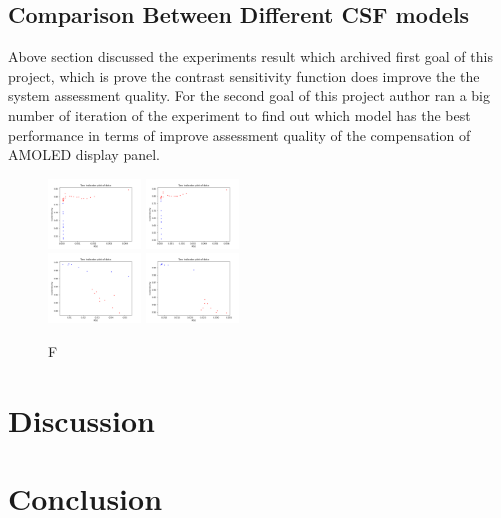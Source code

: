 \documentclass{article}
\begin{document}
\subsection{Comparison Between Different CSF models}
Above section discussed the experiments result which archived first goal of this project, which is prove the contrast sensitivity function does improve the the system assessment quality. For the second goal of this project author ran a big number of iteration of the experiment to find out which model has the best performance in terms of improve assessment quality of the compensation of AMOLED display panel. 
\begin{figure}[h]
    \centering
    \includegraphics[width=0.22\textwidth]{images/Barton_CSFed_G_01r_23b_result.png}\hfill    
    \includegraphics[width=0.22\textwidth]{images/Daly_CSFed_G_01r_23b_result.png}\hfill
    \\[\smallskipamount]    
    \includegraphics[width=0.22\textwidth]{images/NewDoG_Streched_CSFed_A1_G_01r_23b_result.png}\hfill
    \includegraphics[width=0.22\textwidth]{images/MS_STRECH_CSFED_G_A1_01r_23b_result.png}
    \caption{ F }
    \label{fig5}
\end{figure}

\section{Discussion}
\section{Conclusion}
\end{document}
